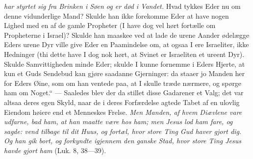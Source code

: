 \documentclass[12pt,a4paper]{book}
\begin{document}
\emph{har styrtet sig fra Brinken i Søen og er død i Vandet.} Hvad tykkes Eder nu om denne
vidunderlige Mand? Skulde han ikke forekomme Eder at have nogen Lighed med en af de gamle
Propheter (I have dog vel hørt fortælle om Propheterne i Israel)? Skulde han maaskee ved at
lade de urene Aander ødelægge Eders urene Dyr ville give Eder en Paamindelse om, at ogsaa I
ere Israeliter, ikke Hedninger (thi dette have I dog nok hørt, at Svinet er Israeliten et
ureent Dyr). Skulde Samvittigheden minde Eder; skulde I kunne fornemme i Eders Hjerte, at
kun et Guds Sendebud kan gjøre saadanne Gjerninger: da staaer jo Manden her for Eders Øine,
som om han ventede paa, at I skulle træde nærmere, og spørge ham om Noget.“ --- Saaledes
blev der da stillet disse Gadarener et Valg; det var altsaa deres egen Skyld, naar de i
deres Forfærdelse agtede Tabet af en ulovlig Eiendom høiere end et Menneskes Frelse.
\emph{Men Manden, af hvem Diævlene vare udfarne, bad ham, at han maatte være hos ham; men
Jesus lod ham fare, og sagde: vend tilbage til dit Huus, og fortæl, hvor store Ting Gud
haver gjort dig. Og han gik bort, og forkyndte igjennem den ganske Stad, hvor store Ting
Jesus havde gjort ham} (Luk. 8, 38---39).
\end{document}

